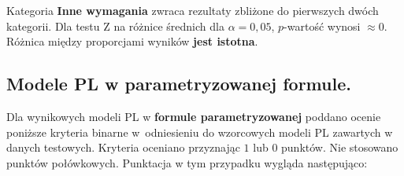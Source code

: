 
Kategoria \textbf{Inne wymagania} zwraca rezultaty zbliżone do pierwszych dwóch kategorii. Dla testu Z na różnice średnich dla $\alpha = 0,05$, %
$p$-wartość wynosi $\approx0$. Różnica między proporcjami wyników \textbf{jest istotna}.

\subsection{Modele PL w parametryzowanej formule.}\label{ch:experiment:parameters}

Dla wynikowych modeli PL w \textbf{formule parametryzowanej} poddano ocenie poniższe kryteria binarne w~odniesieniu do wzorcowych modeli PL zawartych w danych testowych. Kryteria oceniano przyznając $1$ lub $0$ punktów. Nie stosowano punktów połówkowych. Punktacja w tym przypadku wygląda następująco:

